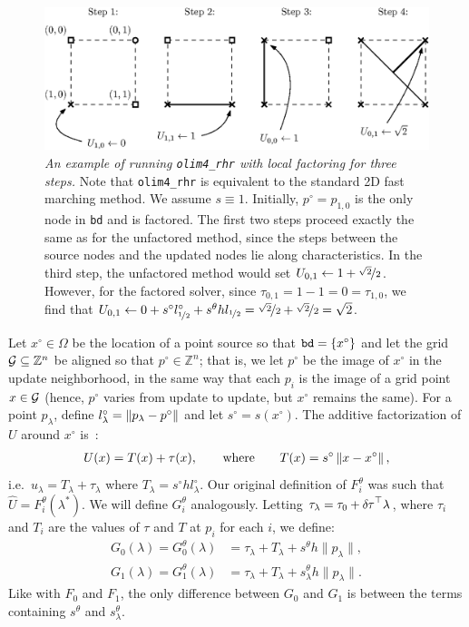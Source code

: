 \documentclass[smallcondensed]{svjour3}
\begin{document}
\begin{figure}
  \centering
  \includegraphics[width=\linewidth]{factoring-example.eps}
  \caption{\emph{An example of running \texttt{olim4\_rhr} with local
      factoring for three steps.} Note that \texttt{olim4\_rhr} is
    equivalent to the standard 2D fast marching method. We assume
    $s \equiv 1$. Initially, $p^\circ = p_{1, 0}$ is the only node in
    \texttt{bd} and is factored. The first two steps proceed exactly
    the same as for the unfactored method, since the steps between the
    source nodes and the updated nodes lie along characteristics. In
    the third step, the unfactored method would set
    $U_{0,1} \gets 1 + \nicefrac{\sqrt{2}}{2}$. However, for the
    factored solver, since $\tau_{0,1} = 1 - 1 = 0 = \tau_{1,0}$, we
    find that
    $U_{0,1} \gets 0 + s^\circ l^\circ_{\nicefrac{1}{2}} + s^\theta h
    l_{\nicefrac{1}{2}} = \nicefrac{\sqrt{2}}{2} +
    \nicefrac{\sqrt{2}}{2} = \sqrt{2}$.}\label{fig:factoring-example}
\end{figure}

Let $x^\circ \in \Omega$ be the location of a point source so that
$\texttt{bd} = \left\{x^\circ\right\}$ and let the grid
$\mathcal{G} \subseteq \mathbb{Z}^n$ be aligned so that
$p^\circ \in \mathbb{Z}^n$; that is, we let $p^\circ$ be the image of
$x^\circ$ in the update neighborhood, in the same way that each $p_i$
is the image of a grid point $x \in \mathcal{G}$ (hence, $p^\circ$ varies
from update to update, but $x^\circ$ remains the same). For a point
$p_\lambda$, define $l^\circ_\lambda = \left\|p_\lambda - p^\circ\right\|$ and
let $s^\circ = s(x^\circ)$. The additive factorization of $U$ around
$x^\circ$ is~\cite{luo2012fast,qi2018corner}:
\begin{align}
  U(x) = T(x) + \tau(x), \qquad \text{where} \qquad T(x) = s^\circ \left\|x - x^\circ\right\|,
\end{align}
i.e.\ $u_\lambda = T_\lambda + \tau_\lambda$ where
$T_\lambda = s^\circ h l^\circ_\lambda$. Our original definition of
$F_i^\theta$ was such that $\hat{U} = F_i^\theta(\lambda^*)$. We will
define $G_i^\theta$ analogously. Letting
$\tau_\lambda = \tau_0 + {\delta \hspace{-0.05em} \tau}^\top \lambda$, where $\tau_i$ and
$T_i$ are the values of $\tau$ and $T$ at $p_i$ for each $i$, we
define:
\begin{align}
  \label{eq:Gi}
  G_0(\lambda) = G_0^\theta(\lambda) &= \tau_\lambda + T_\lambda + s^\theta h \|p_\lambda\|, \\
  G_1(\lambda) = G_1^\theta(\lambda) &= \tau_\lambda + T_\lambda + s^\theta_\lambda h \|p_\lambda\|.
\end{align}
Like with $F_0$ and $F_1$, the only difference between
$G_0$ and $G_1$ is between the terms containing
$s^\theta$ and $s^\theta_\lambda$.
\end{document}
